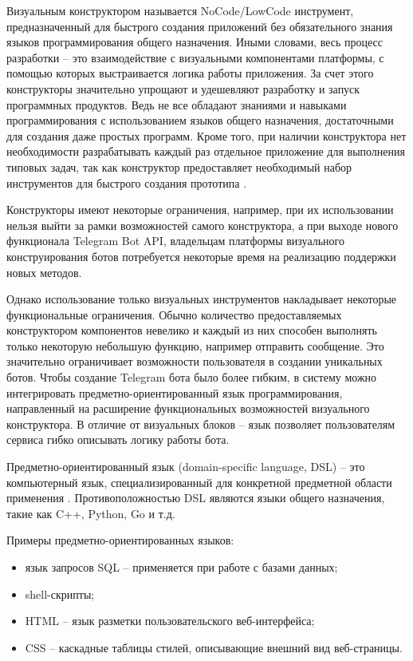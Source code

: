 Визуальным конструктором называется NoCode/LowCode инструмент,
предназначенный для быстрого создания приложений без обязательного знания языков программирования общего назначения.
Иными словами, весь процесс разработки -- это взаимодействие с визуальными компонентами платформы,
с помощью которых выстраивается логика работы приложения.
За счет этого конструкторы значительно упрощают и удешевляют разработку и запуск программных продуктов.
Ведь не все обладают знаниями и навыками программирования с использованием языков общего назначения, достаточными для создания даже простых программ.
Кроме того, при наличии конструктора нет необходимости разрабатывать каждый раз отдельное приложение для выполнения типовых задач,
так как конструктор предоставляет необходимый набор инструментов для быстрого создания прототипа .

Конструкторы имеют некоторые ограничения, например, при их использовании нельзя выйти за рамки возможностей самого конструктора,
а при выходе нового функционала Telegram Bot API,
владельцам платформы визуального конструирования ботов потребуется некоторые время на реализацию поддержки новых методов.

Однако использование только визуальных инструментов накладывает некоторые функциональные ограничения.
Обычно количество предоставляемых конструктором компонентов невелико и каждый из них способен выполнять только некоторую небольшую функцию, например отправить сообщение.
Это значительно ограничивает возможности пользователя в создании уникальных ботов.
Чтобы создание Telegram бота было более гибким, в систему можно интегрировать предметно-ориентированный язык программирования,
направленный на расширение функциональных возможностей визуального конструктора.
В отличие от визуальных блоков – язык позволяет пользователям сервиса гибко описывать логику работы бота.

Предметно-ориентированный язык (domain-specific language, DSL) -- это компьютерный язык, специализированный для конкретной предметной области применения .
Противоположностью DSL являются языки общего назначения, такие как C++, Python, Go и т.д.

Примеры предметно-ориентированных языков:
\begin{itemize}
    \item язык запросов SQL -- применяется при работе с базами данных;
    \item shell-скрипты;
    \item HTML -- язык разметки пользовательского веб-интерфейса;
    \item CSS -- каскадные таблицы стилей, описывающие внешний вид веб-страницы.
\end{itemize}

